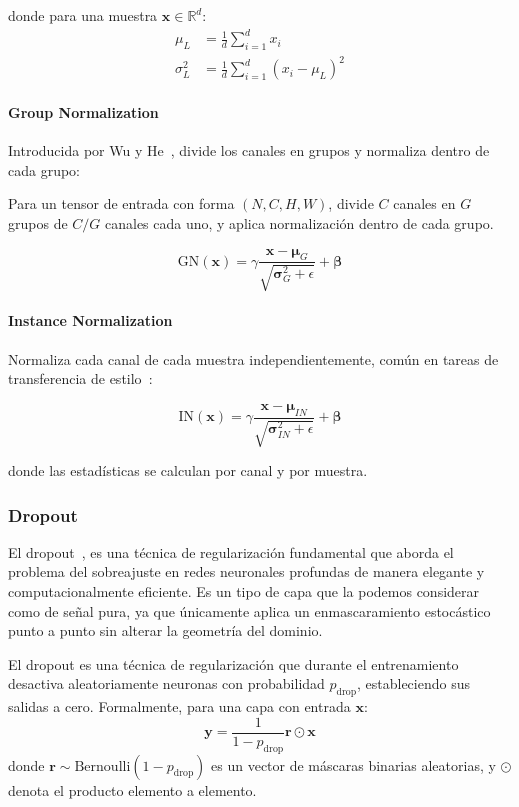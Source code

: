 donde para una muestra $\mathbf{x} \in \mathbb{R}^d$:
\begin{align}
\mu_L &= \frac{1}{d} \sum_{i=1}^d x_i \\
\sigma^2_L &= \frac{1}{d} \sum_{i=1}^d (x_i - \mu_L)^2
\end{align}

\paragraph{Group Normalization}

Introducida por Wu y He~\citep{wu2018group}, divide los canales en grupos y normaliza dentro de cada grupo:

Para un tensor de entrada con forma $(N, C, H, W)$, divide $C$ canales en $G$ grupos de $C/G$ canales cada uno, y aplica normalización dentro de cada grupo.

\[
\text{GN}(\mathbf{x}) = \gamma \frac{\mathbf{x} - \boldsymbol{\mu}_G}{\sqrt{\boldsymbol{\sigma}^2_G + \epsilon}} + \boldsymbol{\beta}
\]

\paragraph{Instance Normalization}

Normaliza cada canal de cada muestra independientemente, común en tareas de transferencia de estilo~\citep{ulyanov2016instance}:

\[
\text{IN}(\mathbf{x}) = \gamma \frac{\mathbf{x} - \boldsymbol{\mu}_{IN}}{\sqrt{\boldsymbol{\sigma}^2_{IN} + \epsilon}} + \boldsymbol{\beta}
\]

donde las estadísticas se calculan por canal y por muestra.

\subsubsection{Dropout}

El dropout~\citep{srivastava2014dropout}, es una técnica de regularización fundamental que aborda el problema del sobreajuste en redes neuronales profundas de manera elegante y computacionalmente eficiente. Es un tipo de capa que la podemos considerar como de señal pura, ya que únicamente aplica un enmascaramiento estocástico punto a punto sin alterar la geometría del dominio.

\begin{definition}[Dropout]\label{def:dropout}
	El dropout es una técnica de regularización que durante el entrenamiento desactiva aleatoriamente neuronas con probabilidad $p_{\text{drop}}$, estableciendo sus salidas a cero. Formalmente, para una capa con entrada $\mathbf{x}$:
	\[
	\mathbf{y} = \frac{1}{1-p_{\text{drop}}} \mathbf{r} \odot \mathbf{x}
	\]
	donde $\mathbf{r} \sim \text{Bernoulli}(1-p_{\text{drop}})$ es un vector de máscaras binarias aleatorias, y $\odot$ denota el producto elemento a elemento.
\end{definition}

